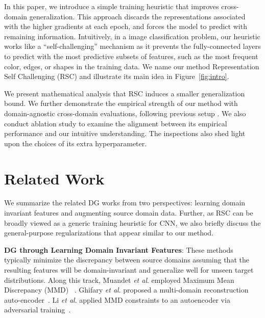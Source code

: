 \documentclass[runningheads]{llncs}
\newcommand{\method}{RSC}
\begin{document}
In this paper, we introduce a simple training heuristic that improves cross-domain generalization. This approach discards the representations associated with the higher gradients at each epoch, and forces the model to predict with remaining information. 
Intuitively, in a image classification problem, our heuristic works like a ``self-challenging'' mechanism as it prevents the fully-connected layers to predict with the most predictive subsets of features, such as the most frequent color, edges, or shapes in the training data. 
We name our method Representation Self Challenging (\method{}) and illustrate its main idea in Figure~\ref{fig:intro}. 









We present mathematical analysis that \method{} induces a smaller generalization bound. We further demonstrate the empirical strength of our method with domain-agnostic cross-domain evaluations, following previous setup \cite{wang2018learning}. 
We also conduct ablation study to examine the alignment between its empirical performance and our intuitive understanding. 
The inspections also shed light upon the choices of its extra hyperparameter. 

%
 
\section{Related Work}
\label{sec:related}








We summarize the related DG works from two perspectives: 
learning domain invariant features and augmenting source domain data. 
Further, as \method{} can be broadly viewed 
as a generic training heuristic for CNN, 
we also briefly discuss the general-purpose regularizations that appear 
similar to our method. 












\textbf{DG through Learning Domain Invariant Features}: 
These methods typically minimize the discrepancy between source domains 
assuming that the resulting features will be domain-invariant 
and generalize well for unseen target distributions. 
Along this track, 
Muandet \textit{et al}. employed Maximum Mean Discrepancy (MMD) ~\cite{muandet2013domain}. Ghifary \textit{et al}. proposed a multi-domain reconstruction auto-encoder~\cite{ghifary2015domain}. 
Li \textit{et al}. applied MMD constraints to an autoencoder via adversarial training~\cite{li2018domain}. 
\end{document}
